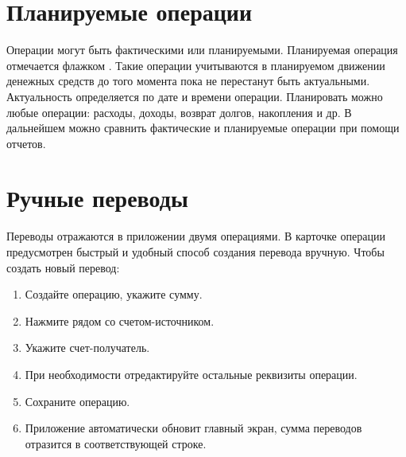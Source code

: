 \documentclass[a4paper,10pt,russian]{sphinxmanual}
\begin{document}
\noindent{}

\noindent{}


\section{Планируемые операции}
\label{\detokenize{transactions:id4}}
Операции могут быть фактическими или планируемыми. Планируемая операция отмечается флажком . Такие операции
учитываются в планируемом движении денежных средств до того момента пока не перестанут быть актуальными.
Актуальность определяется по дате и времени операции. Планировать можно любые операции: расходы, доходы,
возврат долгов, накопления и др. В дальнейшем можно сравнить фактические и планируемые операции при помощи отчетов.

\noindent{}


\section{Ручные переводы}
\label{\detokenize{transactions:id5}}
Переводы отражаются в приложении двумя операциями. В карточке операции предусмотрен быстрый и удобный способ
создания перевода вручную. Чтобы создать новый перевод:
\begin{enumerate}
\def\theenumi{\arabic{enumi}}
\def\labelenumi{\theenumi .}
\makeatletter\def\p@enumii{\p@enumi \theenumi .}\makeatother
\item {} 
Создайте операцию, укажите сумму.

\item {} 
Нажмите  рядом со счетом-источником.

\item {} 
Укажите счет-получатель.

\item {} 
При необходимости отредактируйте остальные реквизиты операции.

\item {} 
Сохраните операцию.

\item {} 
Приложение автоматически обновит главный экран, сумма переводов отразится в соответствующей строке.

\end{enumerate}
\end{document}
